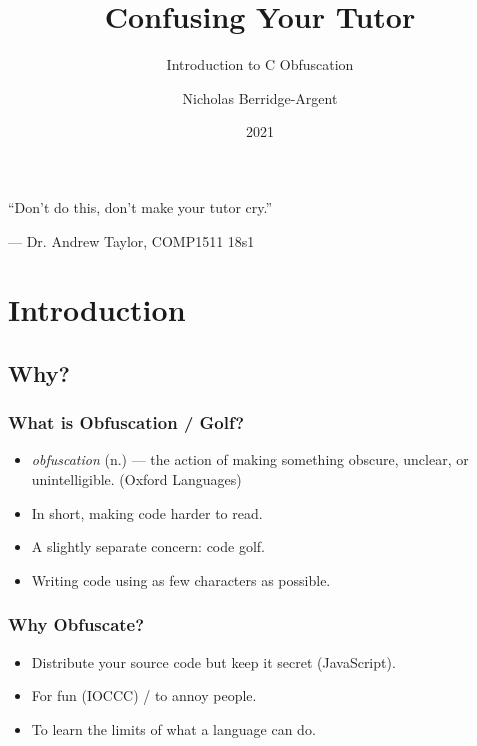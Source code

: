\documentclass[xcolor]{beamer}
\author{Nicholas Berridge-Argent}
\title{Confusing Your Tutor}
\subtitle{Introduction to C Obfuscation}
\date{2021}
\begin{document}
\begin{frame}
	\titlepage
\end{frame}


\begin{frame}
	\begin{center}
		``Don't do this, don't make your tutor cry.''
		
		\hspace{2cm}--- Dr. Andrew Taylor, COMP1511 18s1
	\end{center}
\end{frame}

\section{Introduction}

\subsection{Why?}

\begin{frame}
	\frametitle{What is Obfuscation / Golf?}
	\pause
	
	\begin{itemize}
		\item \textit{obfuscation} (n.) --- the action of making something obscure, unclear, or unintelligible. (Oxford Languages)
		\pause
		\item In short, making code harder to read.
		\pause
		\item A slightly separate concern: code golf.
		\pause
		\item Writing code using as few characters as possible.
	\end{itemize}
\end{frame}

\begin{frame}
	\frametitle{Why Obfuscate?}
	\pause
	
	\begin{itemize}
		\item Distribute your source code but keep it secret (JavaScript).
		\pause
		\item For fun (IOCCC) / to annoy people.
		\pause
		\item To learn the limits of what a language can do.
	\end{itemize}
\end{frame}
\end{document}
